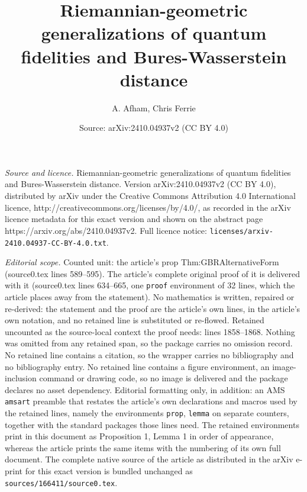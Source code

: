 \documentclass[10pt,a4paper]{amsart}
\title{\vspace*{-2cm}Riemannian-geometric generalizations of quantum fidelities and Bures-Wasserstein distance}
\author{A. Afham, Chris Ferrie}
\date{Source: arXiv:2410.04937v2 (CC BY 4.0)}
\begin{document}
\maketitle

\noindent\emph{Source and licence.} \vspace*{-2cm}Riemannian-geometric generalizations of quantum fidelities and Bures-Wasserstein distance. Version arXiv:2410.04937v2 (CC BY 4.0), distributed by arXiv under the Creative Commons Attribution 4.0 International licence, http://creativecommons.org/licenses/by/4.0/, as recorded in the arXiv licence metadata for this exact version and shown on the abstract page https://arxiv.org/abs/2410.04937v2. Full licence notice: \texttt{licenses/arxiv-2410.04937-CC-BY-4.0.txt}.\par\smallskip

\noindent\textit{Editorial scope.} Counted unit: the article's prop Thm:GBRAlternativeForm (source0.tex lines 589--595). The article's complete original proof of it is delivered with it (source0.tex lines 634--665, one \texttt{proof} environment of 32 lines, which the article places away from the statement). No mathematics is written, repaired or re-derived: the statement and the proof are the article's own lines, in the article's own notation, and no retained line is substituted or re-flowed.  Retained uncounted as the source-local context the proof needs: lines 1858--1868.  Nothing was omitted from any retained span, so the package carries no omission record.  No retained line contains a citation, so the wrapper carries no bibliography and no bibliography entry.  No retained line contains a figure environment, an image-inclusion command or drawing code, so no image is delivered and the package declares no asset dependency.  Editorial formatting only, in addition: an AMS \texttt{amsart} preamble that restates the article's own declarations and macros used by the retained lines, namely the environments \texttt{prop}, \texttt{lemma} on separate counters, together with the standard packages those lines need.  The retained environments print in this document as Proposition 1, Lemma 1 in order of appearance, whereas the article prints the same items with the numbering of its own full document.  The complete native source of the article as distributed in the arXiv e-print for this exact version is bundled unchanged as \texttt{sources/166411/source0.tex}.
\end{document}
